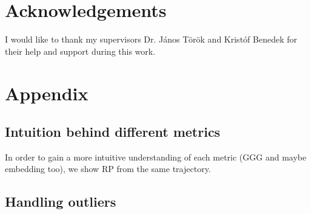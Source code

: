 \documentclass[a4paper,12pt]{article}
\begin{document}




\section{Acknowledgements }

I would like to thank my supervisors Dr. János Török and Kristóf Benedek for their help and support during this work.

\newpage



\section{Appendix }

\subsection{Intuition behind different metrics}

In order to gain a more intuitive understanding of each metric (GGG and maybe embedding too), we show RP from the same trajectory.



\subsection{Handling outliers} %
\end{document}
